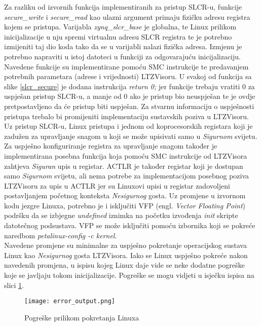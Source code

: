 \documentclass[times, utf8, diplomski, numeric]{fer}
\begin{document}
Za razliku od izvornih funkcija implementiranih za pristup SLCR-u, funkcije \textit{secure\_write} i \textit{secure\_read} kao
ulazni argument primaju fizičku adresu registra kojem se pristupa. Varijabla \textit{zynq\_slcr\_base} je globalna, te Linux
prilikom inicijalizacije u nju spremi virtualnu adresu SLCR registra te je potrebno izmijeniti taj dio koda tako da se u
varijabli nalazi fizička adresa. Izmjenu je potrebno napraviti u istoj datoteci u funkciji za odgovarajuću inicijalizaciju.
Navedene funkcije su implementirane pomoću SMC instrukcije te predavanjem potrebnih parametara (adrese i vrijednosti) LTZVisoru.
U svakoj od funkcija sa slike \ref{slcr_secure} je dodana instrukcija \textit{return 0;} jer funkcije trebaju vratiti 0 za
uspješan pristup SLCR-u, a manje od 0 ako je pristup bio neuspješan te je ovdje pretpostavljeno da će pristup biti uspješan.
Za stvarnu informaciju o uspješnosti pristupa trebalo bi promijeniti implementaciju sustavskih poziva u LTZVisoru.
Uz pristup SLCR-u, Linux pristupa i jednom od koprocesorskih registara koji je zadužen za upravljanje snagom u koji se može
upisivati samo u \textit{Sigurnom} svijetu. Za uspješno konfiguriranje registra za upravljanje snagom također je implementirana posebna
funkcija koja pomoću SMC instrukcije od LTZVisora zahtjeva \textit{Siguran} upis u registar. ACTLR je također registar koji je dostupan
samo \textit{Sigurnom} svijetu, ali nema potrebe za implementacijom posebnog poziva LTZVisoru za upis u ACTLR jer su Linuxovi upisi u
registar zadovoljeni postavljanjem početnog konteksta \textit{Nesigurnog} gosta.
Uz promjene u izvornom kodu jezgre Linuxa, potrebno je i isključiti VFP (engl. \textit{Vector Floating Point}) podršku da se
izbjegne \textit{undefined} iznimka na početku izvođenja \textit{init} skripte datotečnog podsustava. VFP se može isključiti
pomoću izbornika koji se pokreće naredbom \textit{petalinux-config -c kernel}.\\
Navedene promjene su minimalne za uspješno pokretanje operacijskog sustava Linux kao \textit{Nesigurnog} gosta LTZVisora. Iako se Linux
uspješno pokreće nakon navedenih promjena, u ispisu kojeg Linux daje vide se neke dodatne pogreške koje se javljaju tokom
inicijalizacije. Pogreške se mogu vidjeti u isječku ispisa na slici \ref{plnx_errors}.

\begin{figure}[H]
  \centering
  \texttt{[image: error\_output.png]}
  \caption{Pogreške prilikom pokretanja Linuxa}
  \label{plnx_errors}
\end{figure}
\end{document}
